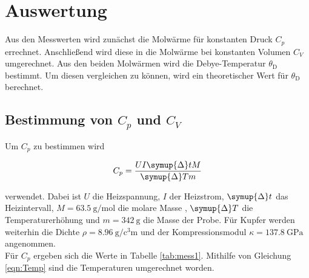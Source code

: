\section{Auswertung}
\label{sec:Auswertung}

Aus den Messwerten wird zunächst die Molwärme für konstanten Druck $C_p$ errechnet. Anschließend wird diese in die Molwärme bei 
konstanten Volumen $C_V$ umgerechnet. Aus den beiden Molwärmen wird die Debye-Temperatur $\theta_\text{D}$ bestimmt. Um diesen 
vergleichen zu können, wird ein theoretischer Wert für $\theta_\text{D}$ berechnet. 

\subsection{Bestimmung von $C_p$ und $C_V$}

Um $C_p$ zu bestimmen wird 

\begin{equation*}
    C_p = \frac{U I \symup{\Delta}t M}{\symup{\Delta} T m}
\end{equation*}

verwendet. Dabei ist $U$ die Heizspannung, $I$ der Heizstrom, $\symup{\Delta}t$ das Heizintervall, $M = \SI{63.5}{\gram\per\mole}$ die molare Masse \cite{Molare}, 
$\symup{\Delta}T$ die Temperaturerhöhung und $m = \SI{342}{\gram}$ \cite{Anleitung} die Masse der Probe. Für Kupfer werden weiterhin die Dichte $\rho = \SI{8.96}{\gram\per\cubic\centi\meter}$
\cite{KompDichte} und der Kompressionsmodul $\kappa = \SI{137.8}{\giga\pascal}$ \cite{KompDichte} angenommen.\\

Für $C_p$ ergeben sich die Werte in Tabelle \ref{tab:mess1}. Mithilfe von Gleichung \eqref{eqn:Temp} sind die Temperaturen umgerechnet worden. 

